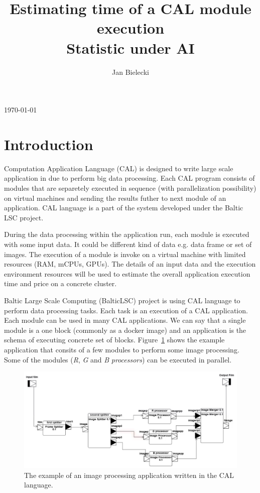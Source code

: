 \documentclass{article}
\title{%
	Estimating time of a CAL module execution \\
	\large Statistic under AI
}
\author{Jan Bielecki}
\begin{document}
	\maketitle
	\today
	\section{Introduction}
	 Computation Application Language (CAL) is designed to write large scale application in due to perform big data processing. Each CAL program consists of modules that are separetely executed in sequence (with parallelization possibility) on virtual machines and sending the results futher to next module of an application. CAL language is a part of the system developed under the Baltic LSC\cite{baltic_lsc_website} project.
	
	During the data processing within the application run, each module is executed with some input data. It could be different kind of data e.g. data frame or set of images. The execution of a module is invoke on a virtual machine with limited resources (RAM, mCPUs, GPUs). The details of an input data and the execution environment resources will be used to estimate the overall application execution time and price on a concrete cluster.
	
	Baltic Large Scale Computing (BalticLSC\cite{baltic_lsc}) project is using CAL language to perform data processing tasks. Each task is an execution of a CAL application. Each module can be used in many CAL applications. We can say that a single module is a one block (commonly as a docker image) and an application is the schema of executing concrete set of blocks. Figure~\ref{fig:example_app} shows the example application that consits of a few modules to perform some image processing. Some of the modules (\textit{R}, \textit{G} and \textit{B} \textit{processors}) can be executed in parallel.
	
	\begin{figure}[!htb]
		\caption{The example of an image processing application written in the CAL language.}
		\centering
		\label{fig:example_app}
		\includegraphics[width=1.0\textwidth]{images/example_app}
	\end{figure}
	
\end{document}

